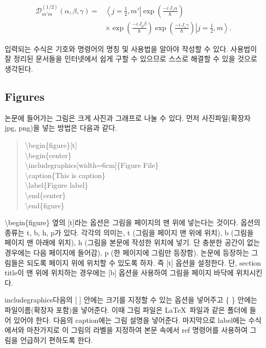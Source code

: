 \documentclass[twoside,11pt]{gshs_thesis}
\begin{document}
\begin{equation}
\begin{split}
\mathcal{D}_{m'm}^{(1/2)} (\alpha,\beta,\gamma)=&\left\langle j=\frac{1}{2},m'\right|\exp\left(\frac{-i\,J_z \alpha}{\hbar}\right)\\
&\times\exp\left(\frac{-i\,J_y \beta}{\hbar}\right)\exp\left(\frac{-i\,J_z \gamma}{\hbar}\right)\left| j=\frac{1}{2},m\right\rangle.
\end{split}
\label{eq004}
\end{equation}

 입력되는 수식은 기호와 명령어의 명칭 및 사용법을 알아야 작성할 수 있다. 사용법이 잘 정리된 문서들을 인터넷에서 쉽게 구할 수 있으므로 스스로 해결할 수 있을 것으로 생각된다.


\subsection{Figures}
논문에 들어가는 그림은 크게 사진과 그래프로 나눌 수 있다. 먼저 사진파일(확장자 jpg, png)을 넣는 방법은 다음과 같다.
\begin{quote}
{\textbackslash}begin\{figure\}[t]\\
{\textbackslash}begin\{center\}\\
{\textbackslash}includegraphics[width=6cm]\{Figure File\}\\
{\textbackslash}caption\{This is caption\}\\
{\textbackslash}label\{Figure label\}\\
{\textbackslash}end\{center\}\\
{\textbackslash}end\{figure\}
\end{quote}
{\textbackslash}begin\{figure\} 옆의 [t]라는 옵션은 그림을 페이지의 맨 위에 넣는다는 것이다. 옵션의 종류는 t, b, h, p가 있다. 각각의 의미는, t (그림을 페이지 맨 위에 위치), b (그림을 페이지 맨 아래에 위치), h (그림을 본문에 작성한 위치에 넣기. 단 충분한 공간이 없는 경우에는 다음 페이지에 들어감), p (한 페이지에 그림만 등장함). 논문에 등장하는 그림들은 되도록 페이지 위에 위치할 수 있도록 하자. 즉 [t] 옵션을 설정한다. 단, section title이 맨 위에 위치하는 경우에는 [b] 옵션을 사용하여 그림을 페이지 바닥에 위치시킨다.

includegraphics다음의 [ ] 안에는 크기를 지정할 수 있는 옵션을 넣어주고 \{ \} 안에는 파일이름(확장자 포함)을 넣어준다. 이때 그림 파일은 \LaTeX\ 파일과 같은 폴더에 들어 있어야 한다. 다음의 caption에는 그림 설명을 넣어준다. 마지막으로 label에는 수식에서와 마찬가지로 이 그림의 라벨을 지정하여 본문 속에서 ref 명령어를 사용하여 그림을 언급하기 편하도록 한다.
\end{document}
